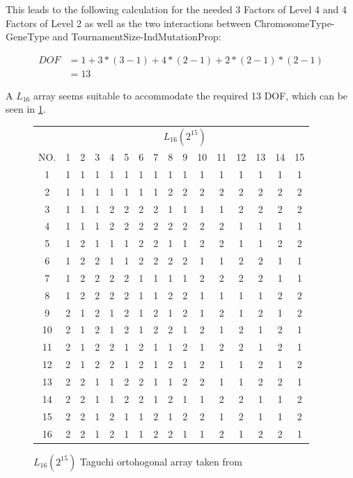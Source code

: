 This leads to the following calculation for the needed 3 Factors of Level 4 and 4 Factors of Level 2 as well as the two interactions between ChromosomeType-GeneType and TournamentSize-IndMutationProp:

\begin{equation} \label{DOF}
	\begin{split}
		DOF & = 1 + 3 * (3 - 1) + 4 * (2 - 1) + 2 * (2 - 1) * (2 - 1) \\
		& = 13
	\end{split}
\end{equation}

A $L_{16}$ array seems suitable to accommodate the required 13 DOF, which can be seen in \ref{table:hyperparameter_tuning:L16_orhtogonal_array}.


\begin{figure}[H]
	\centering
\begin{tabular}{ |c||c|c|c|c|c|c|c|c|c|c|c|c|c|c|c|  }
	\hline
	   & \multicolumn{15}{|c|}{ $L_{16}(2^{15})$ } \\
	NO.& 1 & 2 & 3 & 4 & 5 & 6 & 7 & 8 & 9 & 10& 11& 12& 13& 14&15\\
	\hline
	1  & 1 & 1 & 1 & 1 & 1 & 1 & 1 & 1 & 1 & 1 & 1 & 1 & 1 & 1 & 1\\
	2  & 1 & 1 & 1 & 1 & 1 & 1 & 1 & 2 & 2 & 2 & 2 & 2 & 2 & 2 & 2\\
	3  & 1 & 1 & 1 & 2 & 2 & 2 & 2 & 1 & 1 & 1 & 1 & 2 & 2 & 2 & 2\\
	4  & 1 & 1 & 1 & 2 & 2 & 2 & 2 & 2 & 2 & 2 & 2 & 1 & 1 & 1 & 1\\
	5  & 1 & 2 & 1 & 1 & 1 & 2 & 2 & 1 & 1 & 2 & 2 & 1 & 1 & 2 & 2\\
	6  & 1 & 2 & 2 & 1 & 1 & 2 & 2 & 2 & 2 & 1 & 1 & 2 & 2 & 1 & 1\\
	7  & 1 & 2 & 2 & 2 & 2 & 1 & 1 & 1 & 1 & 2 & 2 & 2 & 2 & 1 & 1\\
	8  & 1 & 2 & 2 & 2 & 2 & 1 & 1 & 2 & 2 & 1 & 1 & 1 & 1 & 2 & 2\\
	9  & 2 & 1 & 2 & 1 & 2 & 1 & 2 & 1 & 2 & 1 & 2 & 1 & 2 & 1 & 2\\
	10 & 2 & 1 & 2 & 1 & 2 & 1 & 2 & 2 & 1 & 2 & 1 & 2 & 1 & 2 & 1\\
	11 & 2 & 1 & 2 & 2 & 1 & 2 & 1 & 1 & 2 & 1 & 2 & 2 & 1 & 2 & 1\\
	12 & 2 & 1 & 2 & 2 & 1 & 2 & 1 & 2 & 1 & 2 & 1 & 1 & 2 & 1 & 2\\
	13 & 2 & 2 & 1 & 1 & 2 & 2 & 1 & 1 & 2 & 2 & 1 & 1 & 2 & 2 & 1\\
	14 & 2 & 2 & 1 & 1 & 2 & 2 & 1 & 2 & 1 & 1 & 2 & 2 & 1 & 1 & 2\\
	15 & 2 & 2 & 1 & 2 & 1 & 1 & 2 & 1 & 2 & 2 & 1 & 2 & 1 & 1 & 2\\
	16 & 2 & 2 & 1 & 2 & 1 & 1 & 2 & 2 & 1 & 1 & 2 & 1 & 2 & 2 & 1\\
	\hline
\end{tabular}
\label{table:hyperparameter_tuning:L16_orhtogonal_array}
\caption{ $L_{16}(2^{15})$ Taguchi ortohogonal array taken from \cite{roy_primer_1990}}
\end{figure}


